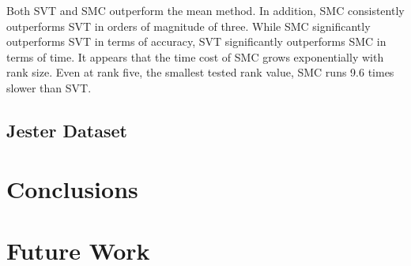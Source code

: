 \documentclass{article} %
\begin{document}
Both SVT and SMC outperform the mean method. In addition, SMC consistently outperforms SVT in orders of magnitude of three.  While SMC significantly outperforms SVT in terms of accuracy, SVT significantly outperforms SMC in terms of time.  It appears that the time cost of SMC grows exponentially with rank size. Even at rank five, the smallest tested rank value, SMC runs 9.6 times slower than SVT. 


\subsection{Jester Dataset}

\section{Conclusions}

\section{Future Work}




\end{document}
